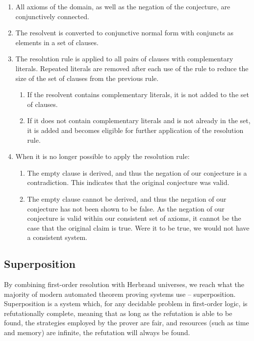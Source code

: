 \begin{enumerate}
	\item All axioms of the domain, as well as the negation of the conjecture, are conjunctively connected.
	\item The resolvent is converted to conjunctive normal form with conjuncts as elements in a set of clauses.
	\item The resolution rule is applied to all pairs of clauses with complementary literals. Repeated literals are removed after each use of the rule to reduce the size of the set of clauses from the previous rule.
		\begin{enumerate}
			\item If the resolvent contains complementary literals, it is not added to the set of clauses.
			\item If it does not contain complementary literals and is not already in the set, it is added and becomes eligible for further application of the resolution rule.
		\end{enumerate}
	\item When it is no longer possible to apply the resolution rule:
		\begin{enumerate}
			\item The empty clause is derived, and thus the negation of our conjecture is a contradiction. This indicates that the original conjecture was valid.
			\item The empty clause cannot be derived, and thus the negation of our conjecture has not been shown to be false. As the negation of our conjecture is valid within our consistent set of axioms, it cannot be the case that the original claim is true. Were it to be true, we would not have a consistent system.
		\end{enumerate}
\end{enumerate}

\subsection{Superposition}

By combining first-order resolution with Herbrand universes, we reach what the majority of modern automated theorem proving systems use -- superposition. Superposition is a system which, for any decidable problem in first-order logic, is refutationally complete, meaning that as long as the refutation is able to be found, the strategies employed by the prover are fair, and resources (such as time and memory) are infinite, the refutation will always be found.

